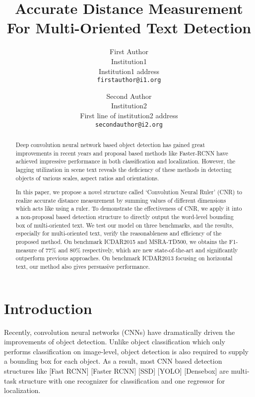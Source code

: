 \documentclass[10pt,twocolumn,letterpaper]{article}
\begin{document}
\title{Accurate Distance Measurement For Multi-Oriented Text Detection}

\author{First Author\\
Institution1\\
Institution1 address\\
{\tt\small firstauthor@i1.org}
\and
Second Author\\
Institution2\\
First line of institution2 address\\
{\tt\small secondauthor@i2.org}
}

\maketitle

\begin{abstract}
	Deep convolution neural network based object detection has gained great improvements in recent years and proposal based methods like Faster-RCNN have achieved impressive performance in both classification and localization. However, the lagging utilization in scene text reveals the deficiency of these methods in detecting objects of various scales, aspect ratios and orientations. 
	
	In this paper, we propose a novel structure called `Convolution Neural Ruler' (CNR) to realize accurate distance measurement by summing values of different dimensions which acts like using a ruler. To demonstrate the effectiveness of CNR, we apply it into a non-proposal based detection structure to directly output the word-level bounding box of multi-oriented text.
	We test our model on three benchmarks, and the results, especially for multi-oriented text, verify the reasonableness and efficiency of the proposed method. On benchmark ICDAR2015 and MSRA-TD500, we obtains the F1-measure of 77\% and 80\% respectively, which are new state-of-the-art and significantly outperform previous approaches. 
	On benchmark ICDAR2013 focusing on horizontal text, our method also gives persuasive performance.
\end{abstract}

\section{Introduction}
	Recently, convolution neural networks (CNNs) have dramatically driven the improvements of object detection. Unlike object classification which only performs classification on image-level, object detection is also required to supply a bounding box for each object. As a result, most CNN based detection structures like [Fast RCNN] [Faster RCNN] [SSD] [YOLO] [Densebox] are multi-task structure with one recognizer for classification and one regressor for localization.
\end{document}
